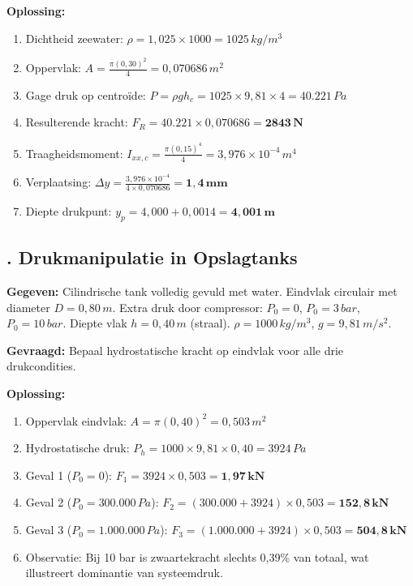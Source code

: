 \documentclass[a4paper,11pt,twoside]{report}
\newcounter{opgave}[section]
\newcommand{\opgave}[1]{%
    \refstepcounter{opgave}%
    \subsection*{\textbf{\arabic{opgave}.} #1}%
}
\begin{document}
\textbf{Oplossing:}
\begin{enumerate}
    \item Dichtheid zeewater: $\rho = 1{,}025 \times 1000 = 1025 \, kg/m^3$
    \item Oppervlak: $A = \frac{\pi (0{,}30)^2}{4} = 0{,}070686 \, m^2$
    \item Gage druk op centroïde: $P = \rho g h_c = 1025 \times 9{,}81 \times 4 = 40.221 \, Pa$
    \item Resulterende kracht: $F_R = 40.221 \times 0{,}070686 = \mathbf{2843 \, N}$
    \item Traagheidsmoment: $I_{xx,c} = \frac{\pi (0{,}15)^4}{4} = 3{,}976 \times 10^{-4} \, m^4$
    \item Verplaatsing: $\Delta y = \frac{3{,}976 \times 10^{-4}}{4 \times 0{,}070686} = \mathbf{1{,}4 \, mm}$
    \item Diepte drukpunt: $y_p = 4{,}000 + 0{,}0014 = \mathbf{4{,}001 \, m}$
\end{enumerate}


\opgave{Drukmanipulatie in Opslagtanks}
\textbf{Gegeven:}
Cilindrische tank volledig gevuld met water. Eindvlak circulair met diameter $D = 0{,}80 \, m$. Extra druk door compressor: $P_0 = 0$, $P_0 = 3 \, bar$, $P_0 = 10 \, bar$. Diepte vlak $h = 0{,}40 \, m$ (straal). $\rho = 1000 \, kg/m^3$, $g = 9{,}81 \, m/s^2$.

\textbf{Gevraagd:}
Bepaal hydrostatische kracht op eindvlak voor alle drie drukcondities.

\textbf{Oplossing:}
\begin{enumerate}
    \item Oppervlak eindvlak: $A = \pi (0{,}40)^2 = 0{,}503 \, m^2$
    \item Hydrostatische druk: $P_h = 1000 \times 9{,}81 \times 0{,}40 = 3924 \, Pa$
    \item Geval 1 ($P_0 = 0$): $F_1 = 3924 \times 0{,}503 = \mathbf{1{,}97 \, kN}$
    \item Geval 2 ($P_0 = 300.000 \, Pa$): $F_2 = (300.000 + 3924) \times 0{,}503 = \mathbf{152{,}8 \, kN}$
    \item Geval 3 ($P_0 = 1.000.000 \, Pa$): $F_3 = (1.000.000 + 3924) \times 0{,}503 = \mathbf{504{,}8 \, kN}$
    \item Observatie: Bij 10 bar is zwaartekracht slechts 0{,}39\% van totaal, wat illustreert dominantie van systeemdruk.
\end{enumerate}
\end{document}

